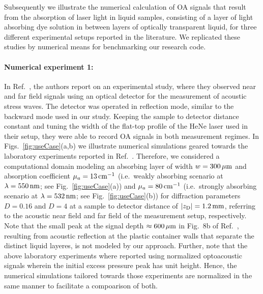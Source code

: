 \documentclass[12pt]{iopart}
\begin{document}
Subsequently we illustrate the numerical calculation of OA signals that result
from the absorption of laser light in liquid samples, consisting of a layer of
light absorbing dye solution in between layers of optically transparent liquid,
for three different experimental setups reported in the literature.  We
replicated these studies by numerical means for benchmarking our research code.

\paragraph{Numerical experiment 1:}
In Ref.\ \cite{Paltauf:2000}, the authors report on an experimental study,
where they observed near and far field signals using an optical detector for
the measurement of acoustic stress waves. The detector was operated in
reflection mode, similar to the backward mode used in our study.  Keeping the
sample to detector distance constant and tuning the width of the flat-top
profile of the HeNe laser used in their setup, they were able to record OA
signals in both measurement regimes.  In Figs.\ \ref{fig:useCase}(a,b) we
illustrate numerical simulations geared towards the laboratory experiments
reported in Ref.\ \cite{Paltauf:2000}.  Therefore, we considered a
computational domain modeling an absorbing layer of width $w=300\,\mu{\rm m}$
and absorption coefficient $\mu_a=13\,\rm{cm}^{-1}$ (i.e.\ weakly absorbing
scenario at $\lambda=550\,{\rm nm}$; see Fig.\ \ref{fig:useCase}(a)) and
$\mu_a=80\,\rm{cm}^{-1}$ (i.e.\ strongly absorbing scenario at
$\lambda=532\,{\rm nm}$; see Fig.\ \ref{fig:useCase}(b)) for diffraction
parameters $D=0.16$ and $D=4$ at a sample to detector distance of $|z_{\rm
D}|=1.2\,{\rm mm}$, referring to the acoustic near field and far field of the
measurement setup, respectively.  Note that the small peak at the signal depth
$\approx 600\,{\rm \mu m}$ in Fig.\ 8b of Ref.\ \cite{Paltauf:2000}, resulting
from acoustic reflection at the plastic container walls that separate the
distinct liquid layeres, is not modeled by our approach. Further, note that the
above laboratory experiments where reported using normalized optoacoustic
signals wherein the initial excess pressure peak has unit height.  Hence, the
numerical simulations tailored towards those experiments are normalized in the
same manner to facilitate a compoarison of both.
\end{document}
